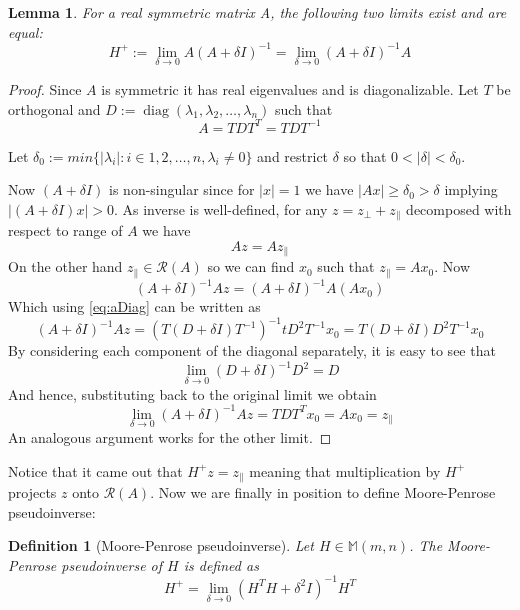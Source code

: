 \documentclass[a4paper,11pt]{article}
\theoremstyle{break}
\newtheorem{definition}{Definition}[section]
\newtheorem{lemma}[theorem]{Lemma}
\newcommand{\Ra}{\mathcal{R}}
\newcommand{\Mat}[2]{\mathbb{M}(#1, #2)}
\DeclareMathOperator{\diag}{diag}
\newcommand{\pll}{\parallel}
\begin{document}
\begin{lemma}\label{lem:limit_existence_1}
    For a real symmetric matrix A, the following two limits exist and are equal:
    \begin{equation}
        H^+ := \lim_{\delta \to 0} A ( A + \delta I) ^{-1}
            = \lim_{\delta \to 0} ( A + \delta I) ^{-1} A
    \end{equation}
\end{lemma}

\begin{proof}
    Since $A$ is symmetric it has real eigenvalues and is diagonalizable.
    Let $T$ be orthogonal and $D := \diag (\lambda_1, \lambda_2, \ldots, \lambda_n)$ such that
    \begin{equation}
    \label{eq:aDiag}
        A = T D T^T = T D T^{-1}
    \end{equation}
    
    Let $ \delta_0 := min\{ | \lambda_i | : i \in {1, 2, \ldots, n}, \lambda_i \neq 0 \}$ and restrict
    $ \delta$ so that $ 0 <  | \delta | < \delta_0$.
    
    Now $(A + \delta I)$ is non-singular since for $ | x | = 1$ we have $ | A x | \geq \delta_0 > \delta$
    implying $ | (A + \delta I) x | > 0 $.
    As inverse is well-defined, for any $z = z_\perp + z_\pll$ decomposed with respect to range of $A$ we have
    $$ A z = A z_\pll$$
    On the other hand $z_\pll \in \Ra(A)$ so we can find $x_0$ such that $ z_\pll = A x_0$. Now
    $$ (A + \delta I)^{-1} A z = (A + \delta I)^{-1} A (A x_0) $$
    Which using \eqref{eq:aDiag} can be written as
    $$ (A + \delta I)^{-1} A z =
    (T(D + \delta I) T^{-1})^{-1} t D^2 T^{-1} x_0 =
    T (D + \delta I) D^2 T^{-1} x_0
    $$
    By considering each component of the diagonal separately, it is easy to see that
    $$ \lim_{\delta \to 0} (D + \delta I)^{-1} D^2 = D $$
    And hence, substituting back to the original limit we obtain
    $$ \lim_{\delta \to 0} ( A + \delta I) ^{-1} A z = T D T^T x_0 = A x_0 = z_\pll $$
    An analogous argument works for the other limit.
\end{proof}

Notice that it came out that $ H^+ z = z_\pll$ meaning that multiplication by $H^+$ projects $z$ onto $\Ra(A)$. Now we are finally in position to define Moore-Penrose pseudoinverse:

\begin{definition}[Moore-Penrose pseudoinverse]
    Let $H \in \Mat{m}{n}$.
    The Moore-Penrose pseudoinverse of $H$ is defined as
    $$ H^+ = \lim_{\delta \to 0} ( H^T H + \delta^2 I) ^{-1} H^T $$
\end{definition}
\end{document}
